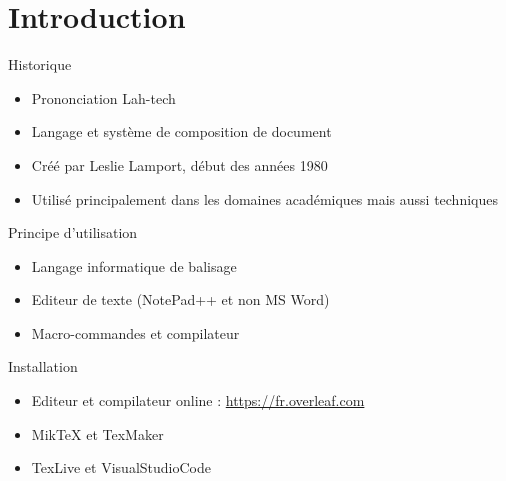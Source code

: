 \section[Introduction]{Introduction}
\begin{frame}{Historique}
    \begin{figure}
        \centering
         \hfill
    \end{figure}
    
    \begin{itemize}[label=$\triangleright$]
        \item Prononciation \og Lah-tech \fg{} 
        \item Langage et système de composition de document
        \item Créé par Leslie Lamport, début des années 1980
        \item Utilisé principalement dans les domaines académiques mais aussi techniques
    \end{itemize}
\end{frame}

\begin{frame}{Principe d'utilisation}
    \begin{itemize}[label=$\triangleright$]
        \item Langage informatique de balisage
        \item Editeur de texte (NotePad++ et non MS Word)
        \item Macro-commandes et compilateur
    \end{itemize}
\end{frame}

\begin{frame}{Installation}
    \begin{itemize}[label=$\triangleright$]
        \item Editeur et compilateur online : \href{https://fr.overleaf.com}{https://fr.overleaf.com}
        \item MikTeX et TexMaker
        \item TexLive et VisualStudioCode
    \end{itemize}
\end{frame}

